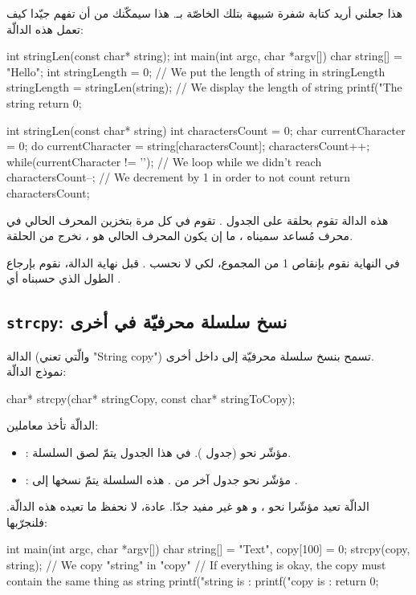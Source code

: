 هذا جعلني أريد كتابة شفرة شبيهة بتلك الخاصّة بـ. هذا سيمكّنك من أن تفهم جيّدا كيف تعمل هذه الدالّة:

\begin{Csource}
int stringLen(const char* string);
int main(int argc, char *argv[])
{
	char string[] = "Hello";
	int stringLength = 0;
	// We put the length of string in stringLength
	stringLength = stringLen(string);
	// We display the length of string
	printf("The string %
	return 0;
}

int stringLen(const char* string)
{
	int charactersCount = 0;
	char currentCharacter = 0;
	do
	{
    	 	currentCharacter = string[charactersCount];
    	 	charactersCount++;
	}
	while(currentCharacter != '\0'); // We loop while we didn't reach \0
	charactersCount--; // We decrement by 1 in order to not count \0
	return charactersCount;
}
\end{Csource}

هذه الدالة
تقوم بحلقة على الجدول
.
تقوم في كل مرة بتخزين المحرف الحالي في محرف مُساعد سميناه
،
ما إن يكون المحرف الحالي هو
،
نخرج من الحلقة.

في النهاية نقوم بإنقاص 1 من المجموع، لكي لا نحسب
.
 قبل نهاية الدالة، نقوم بإرجاع الطول الذي حسبناه أي
.

\subsection{\texttt{strcpy}: نسخ سلسلة محرفيّة في أخرى}

الدالة
(والّتي تعني "\textenglish{String copy}")
تسمح بنسخ سلسلة محرفيّة إلى داخل أخرى.\\
نموذج الدالّة:

\begin{Csource}
char* strcpy(char* stringCopy, const char* stringToCopy);
\end{Csource}

الدالّة تأخذ معاملين:

\begin{itemize}
  \item {}: مؤشّر نحو  (جدول ). في هذا الجدول يتمّ لصق السلسلة.
  \item {}: مؤشّر نحو جدول آخر من . هذه السلسلة يتمّ نسخها إلى .
\end{itemize}
الدالّة تعيد مؤشّرا نحو
،
و هو غير مفيد جدّا. عادة، لا نحفظ ما تعيده هذه الدالّة. فلنجرّبها:
\begin{Csource}
int main(int argc, char *argv[])
{
	char string[] = "Text", copy[100] = {0};
	strcpy(copy, string); // We copy "string" in "copy"
	// If everything is okay, the copy must contain the same thing as string
	printf("string is : %
	printf("copy  is : %
	return 0;
}
\end{Csource}


